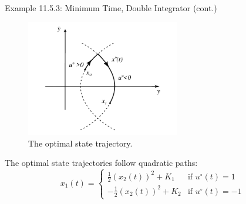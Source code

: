 \documentclass[10pt]{beamer}
\begin{document}
\begin{frame}[fragile]{Example 11.5.3: Minimum Time, Double Integrator (cont.)}
  \begin{figure}
    \centering
    \includegraphics[width=0.6\textwidth]{photos/5.png}
    \caption{The optimal state trajectory.}
  \end{figure}

  The optimal state trajectories follow quadratic paths:
  \[
  x_1(t) = \begin{cases}
  \frac{1}{2} (x_2(t))^2 + K_1 & \text{if } u^\circ(t) = 1 \\
  -\frac{1}{2} (x_2(t))^2 + K_2 & \text{if } u^\circ(t) = -1
  \end{cases}
  \]
\end{frame}
\end{document}
